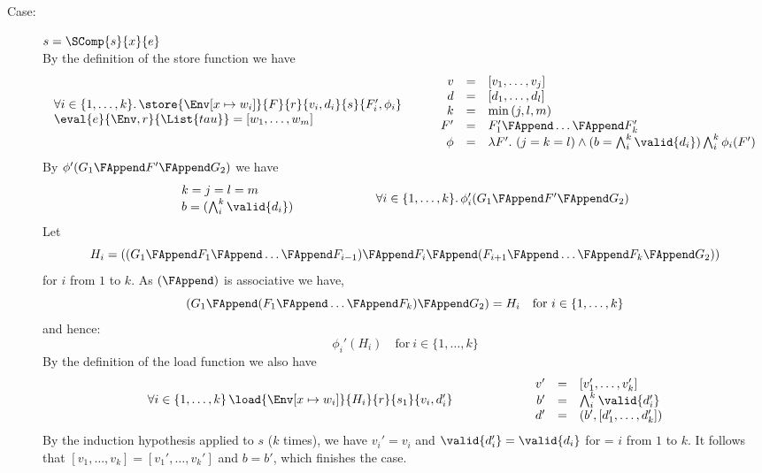 {\begin{description}
\item[Case:] $s = \SComp{s}{x}{e}$\\[1ex]
By the definition of the store function we have
\[
\begin{array}{l}
\forall i \in \{1,\dots,k\}.\,\store{\Env[x \mapsto w_i]}{F}{r}{v_i,d_i}{s}{F_i',\phi_i}\\
\eval{e}{\Env,r}{\List{tau}} = [w_1,\dots,w_m ]\\
\end{array}\hspace*{.75cm}\begin{array}{rcl}
v &=& [v_1,\dots,v_j]\\
d &=& [d_1,\dots,d_l]\\
k &=& \min{(j,l,m)}\\
F' &=& F_1' \FAppend \dots \FAppend F_k'\\
\phi &=& \lambda F'.~(j = k = l) \wedge (b = \bigwedge_i^k \valid{d_i}) \bigwedge_i^k \phi_i(F')\\
\end{array}
\]
By $\phi'(G_1 \FAppend F' \FAppend G_2)$ we have
\[
\begin{array}{l}
k = j = l = m\\
b = (\bigwedge_i^k \valid{d_i})\\
\end{array}\hspace*{2cm}\begin{array}{l}
\forall i \in \{1,\dots,k\}.\,\phi_i'(G_1 \FAppend F' \FAppend G_2) \\
\end{array}
\]
%
Let
\[
H_i = ((G_1\FAppend F_1\FAppend \dots \FAppend F_{i-1}) \FAppend F_i \FAppend (F_{i+1} \FAppend \dots \FAppend F_k \FAppend G_2))
\]
for $i$ from $1$ to $k$. As $(\FAppend)$ is associative we have,
\[
(G_1\FAppend (F_1\FAppend \dots \FAppend F_k)\FAppend G_2) = H_i \quad \text{for}~i \in \{1,\dots,k\}
\]
and hence:
\[
\phi_i'(H_i) \quad \text{for}~i \in \{1,\dots,k\}
\]
%
By the definition of the load function we also have 
\[ 
\begin{array}{l}
\forall i \in \{1,\dots,k\}\,\load{\Env[ x \mapsto w_i]}{H_i}{r}{s_1}{v_i,d_i'}\\
\end{array}\hspace*{2cm}\begin{array}{rcl}
v' &=& [v_1',\dots,v_k']\\
b' &=& \bigwedge_i^k \valid{d_i'}\\
d' &=& (b',[d_1',\dots,d_k'])\\
\end{array}
\]
%
By the induction hypothesis applied to $s$ ($k$ times), we have $v_i'
= v_i$ and $\valid{d_i'} = \valid{d_i}$ for = $i$ from $1$ to
$k$. It follows that $[v_1,\dots,v_k] = [v_1',\dots,v_k']$ and $b =
b'$, which finishes the case.


\end{description}}
